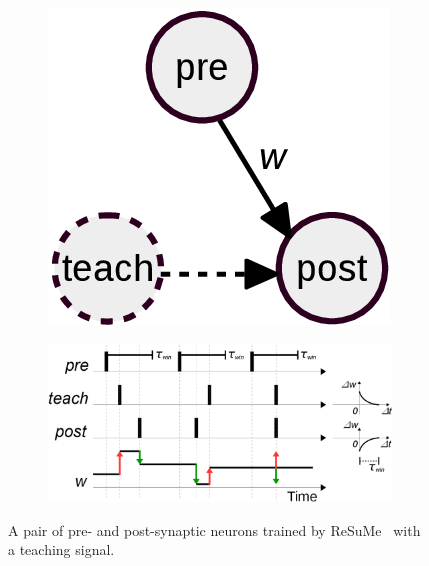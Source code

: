 \begin{figure}
	\centering
	\begin{subfigure}[c]{0.25\textwidth}
		\includegraphics[width=\textwidth]{pics_sdlm/resume.png}
	\end{subfigure}
		\begin{subfigure}[c]{0.7\textwidth}
			\includegraphics[width=\textwidth]{pics_sdlm/resume2.png}
		\end{subfigure}
	\caption[ReSuMe algorithm.]{A pair of pre- and post-synaptic neurons trained by ReSuMe~\citep{ponulak2010supervised} with a teaching signal.}
	\label{fig:resume}
\end{figure}

